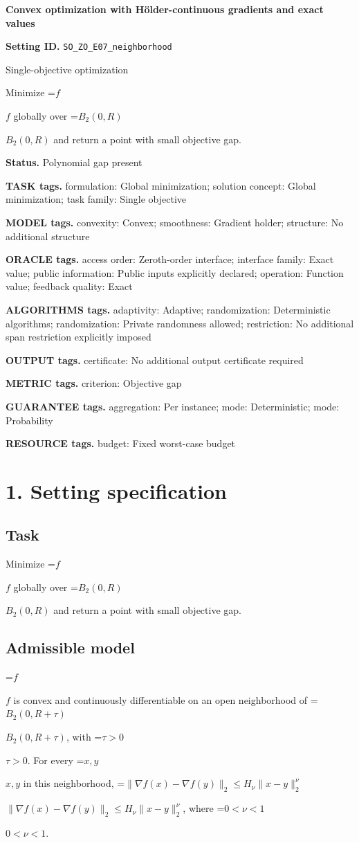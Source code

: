 \documentclass[10pt,a4paper]{article}
\newcommand{\AtlasMath}[1]{\par\begingroup\centering\setbox0=\hbox{$\displaystyle #1$}\ifdim\wd0>1.4\linewidth\typeout{ATLAS WIDE FORMULA: \the\wd0}\fi\ifdim\wd0>\linewidth\resizebox{\linewidth}{!}{\box0}\else\box0\fi\par\endgroup}
\newcommand{\AtlasInlineMath}[1]{\begingroup\setbox0=\hbox{$#1$}\ifdim\wd0>.4\linewidth\endgroup\AtlasMath{#1}\else\endgroup$#1$\fi}
\begin{document}
\raggedright

{\LARGE\bfseries\sffamily\color{AtlasNavy} Convex optimization with Hölder-continuous gradients and exact values\par}\vspace{5pt}
\textbf{Setting ID.} \texttt{SO\_\allowbreak{}\allowbreak{}ZO\_\allowbreak{}\allowbreak{}E07\_\allowbreak{}\allowbreak{}neighborhood}

Single-objective optimization

Minimize \AtlasInlineMath{f} globally over \AtlasInlineMath{B_2(0,R)} and return a point with small objective gap.

\textbf{Status.} Polynomial gap present

\textbf{TASK tags.} formulation: Global minimization; solution concept: Global minimization; task family: Single objective

\textbf{MODEL tags.} convexity: Convex; smoothness: Gradient holder; structure: No additional structure

\textbf{ORACLE tags.} access order: Zeroth-order interface; interface family: Exact value; public information: Public inputs explicitly declared; operation: Function value; feedback quality: Exact

\textbf{ALGORITHMS tags.} adaptivity: Adaptive; randomization: Deterministic algorithms; randomization: Private randomness allowed; restriction: No additional span restriction explicitly imposed

\textbf{OUTPUT tags.} certificate: No additional output certificate required

\textbf{METRIC tags.} criterion: Objective gap

\textbf{GUARANTEE tags.} aggregation: Per instance; mode: Deterministic; mode: Probability

\textbf{RESOURCE tags.} budget: Fixed worst-case budget

\section{1. Setting specification}
\subsection{Task}
Minimize \AtlasInlineMath{f} globally over \AtlasInlineMath{B_2(0,R)} and return a point with small objective gap.

\subsection{Admissible model}
\AtlasInlineMath{f} is convex and continuously differentiable on an open neighborhood of \AtlasInlineMath{B_2(0,R+\tau)}, with \AtlasInlineMath{\tau>0}. For every \AtlasInlineMath{x,y} in this neighborhood, \AtlasInlineMath{\|\nabla f(x)-\nabla f(y)\|_2\le H_\nu\|x-y\|_2^\nu}, where \AtlasInlineMath{0<\nu<1}.
\end{document}
